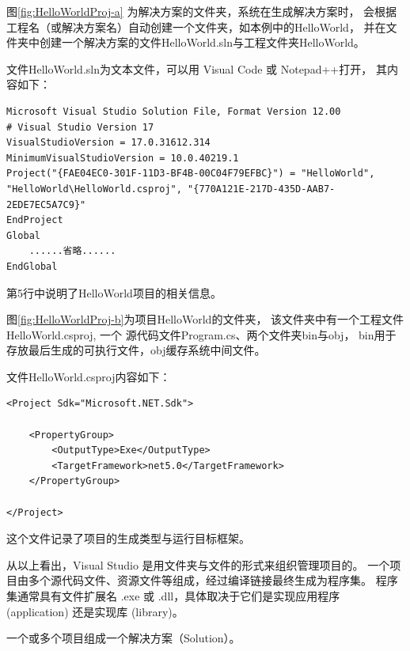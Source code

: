 图\ref{fig:HelloWorldProj-a} 为解决方案的文件夹，系统在生成解决方案时，
会根据工程名（或解决方案名）自动创建一个文件夹，如本例中的HelloWorld，
并在文件夹中创建一个解决方案的文件HelloWorld.sln与工程文件夹HelloWorld。

文件HelloWorld.sln为文本文件，可以用 Visual Code 或 Notepad++打开，
其内容如下：

\begin{lstlisting}
Microsoft Visual Studio Solution File, Format Version 12.00
# Visual Studio Version 17
VisualStudioVersion = 17.0.31612.314
MinimumVisualStudioVersion = 10.0.40219.1
Project("{FAE04EC0-301F-11D3-BF4B-00C04F79EFBC}") = "HelloWorld", "HelloWorld\HelloWorld.csproj", "{770A121E-217D-435D-AAB7-2EDE7EC5A7C9}"
EndProject
Global
	......省略......
EndGlobal
\end{lstlisting}

第5行中说明了HelloWorld项目的相关信息。

图\ref{fig:HelloWorldProj-b}为项目HelloWorld的文件夹，
该文件夹中有一个工程文件HelloWorld.csproj,
一个  \cs  源代码文件Program.cs、两个文件夹bin与obj，
bin用于存放最后生成的可执行文件，obj缓存系统中间文件。

文件HelloWorld.csproj内容如下：
\begin{lstlisting}
<Project Sdk="Microsoft.NET.Sdk">

	<PropertyGroup>
		<OutputType>Exe</OutputType>
		<TargetFramework>net5.0</TargetFramework>
	</PropertyGroup>

</Project>
\end{lstlisting}

这个文件记录了项目的生成类型与运行目标框架。

从以上看出，Visual Studio 是用文件夹与文件的形式来组织管理项目的。
一个项目由多个源代码文件、资源文件等组成，经过编译链接最终生成为程序集。
程序集通常具有文件扩展名 .exe 或 .dll，具体取决于它们是实现应用程序 (application) 还是实现库 (library)。

一个或多个项目组成一个解决方案（Solution）。


